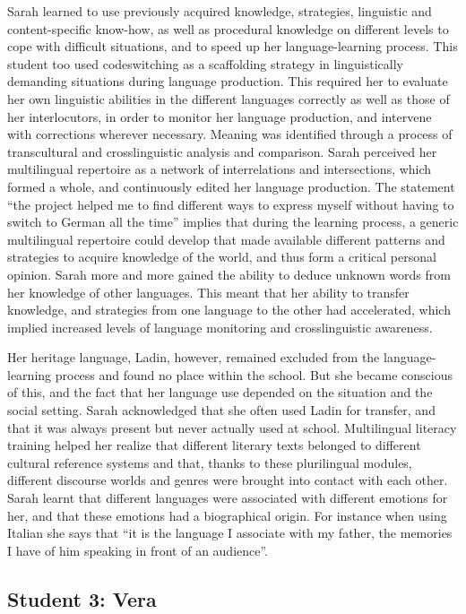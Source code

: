 \documentclass[output=paper]{../langscibook}
\begin{document}
Sarah learned to use previously acquired knowledge, strategies, linguistic and content-specific know-how, as well as procedural knowledge on different levels to cope with difficult situations, and to speed up her language-learning process. This student too used codeswitching as a scaffolding strategy in linguistically demanding situations during language production. This required her to evaluate her own linguistic abilities in the different languages correctly as well as those of her interlocutors, in order to monitor her language production, and intervene with corrections wherever necessary. Meaning was identified through a process of transcultural and crosslinguistic analysis and comparison. Sarah perceived her multilingual repertoire as a network of interrelations and intersections, which formed a whole, and continuously edited her language production. The statement “the project helped me to find different ways to express myself without having to switch to German all the time” implies that  during the learning process, a generic multilingual repertoire could develop that made available different patterns and strategies to acquire knowledge of the world, and thus form a critical personal opinion. Sarah more and more gained the ability to deduce unknown words from her knowledge of other languages. This meant that her ability to transfer knowledge, and strategies from one language to the other had accelerated, which implied increased levels of language monitoring and crosslinguistic awareness. 

Her heritage language, Ladin, however, remained excluded from the language-learning process and found no place within the school. But she became conscious of this, and the fact that her language use depended on the situation and the social setting. Sarah acknowledged that she often used Ladin for transfer, and that it was always present but never actually used at school. Multilingual literacy training helped her realize that different literary texts belonged to different cultural reference systems and that, thanks to these plurilingual modules, different discourse worlds and genres were brought into contact with each other. Sarah learnt that different languages were associated with different emotions for her, and that these emotions had a biographical origin. For instance when using Italian she says that “it is the language I associate with my father, the memories I have of him speaking in front of an audience”.

\subsection{Student 3: Vera}
\end{document}
